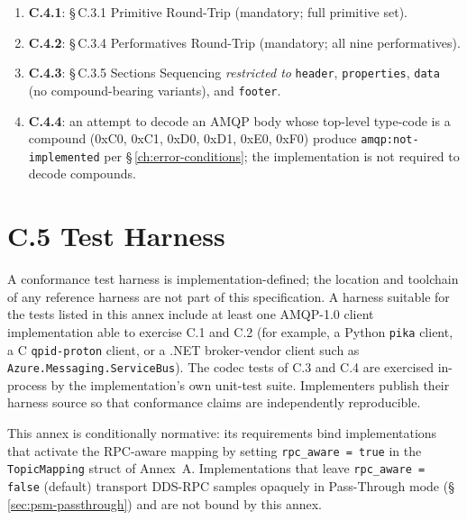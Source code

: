 \documentclass{../styles/zerodds-vendor-spec}
\begin{document}
\begin{enumerate}
  \item \textbf{C.4.1}: \S\,C.3.1 Primitive Round-Trip
        (mandatory; full primitive set).
  \item \textbf{C.4.2}: \S\,C.3.4 Performatives Round-Trip
        (mandatory; all nine performatives).
  \item \textbf{C.4.3}: \S\,C.3.5 Sections Sequencing
        \emph{restricted to} \texttt{header}, \texttt{properties},
        \texttt{data} (no compound-bearing variants), and
        \texttt{footer}.
  \item \textbf{C.4.4}: an attempt to decode an AMQP body
        whose top-level type-code is a compound (\textsf{0xC0},
        \textsf{0xC1}, \textsf{0xD0}, \textsf{0xD1},
        \textsf{0xE0}, \textsf{0xF0})  produce
        \texttt{amqp:not-implemented} per
        \S\,\ref{ch:error-conditions}; the implementation is
        not required to decode compounds.
\end{enumerate}

\section*{C.5 Test Harness}

A conformance test harness is implementation-defined; the
location and toolchain of any reference harness are not part of
this specification. A harness suitable for the tests listed in
this annex  include at least one AMQP-1.0 client
implementation able to exercise C.1 and C.2 (for example, a
Python \texttt{pika} client, a C \texttt{qpid-proton} client, or
a .NET broker-vendor client such as
\texttt{Azure.Messaging.ServiceBus}). The codec tests of C.3 and
C.4 are exercised in-process by the implementation's own
unit-test suite. Implementers  publish their
harness source so that conformance claims are independently
reproducible.

\label{annex:rpc-mapping}

This annex is conditionally normative: its requirements bind
implementations that activate the RPC-aware mapping by setting
\texttt{rpc\_aware = true} in the \texttt{TopicMapping} struct
of Annex~A. Implementations that leave \texttt{rpc\_aware =
false} (default) transport DDS-RPC samples opaquely in
Pass-Through mode (\S\,\ref{sec:psm-passthrough}) and are not
bound by this annex.
\end{document}
